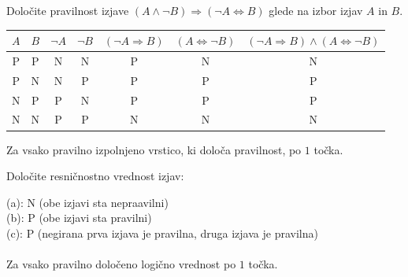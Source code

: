 \documentclass[addpoints]{exam}
\begin{document}
\begin{questions}

    
    \question[4]
    Določite pravilnost izjave $( A \land \lnot B)\Rightarrow (\lnot A \Leftrightarrow B)$ glede na izbor izjav $A$ in $B$.

    \begin{solution}[11cm]
        \begin{table}[H]
            \begin{tabular}{ccccccc}
             $A$ & $B$ & $\lnot A$ & $\lnot B$ & $(\lnot A\Rightarrow B)$ & $(A\Leftrightarrow \lnot B)$ & $(\lnot A\Rightarrow B)\land(A\Leftrightarrow \lnot B)$\\ \hline
             P & P & N & N & P & N & N \\ 
             P & N & N & P & P & P & P \\
             N & P & P & N & P & P & P \\
             N & N & P & P & N & N & N
            \end{tabular}
        \end{table}
        Za vsako pravilno izpolnjeno vrstico, ki določa pravilnost, po $1$ točka.
    \end{solution}




    \question[3]
    Določite resničnostno vrednost izjav:

    \begin{solution}
        (a): N (obe izjavi sta nepraavilni) \\
        (b): P (obe izjavi sta pravilni) \\
        (c): P (negirana prva izjava je pravilna, druga izjava je pravilna) \\ \\
        Za vsako pravilno določeno logično vrednost po $1$ točka.
    \end{solution}




\end{questions}
\end{document}
